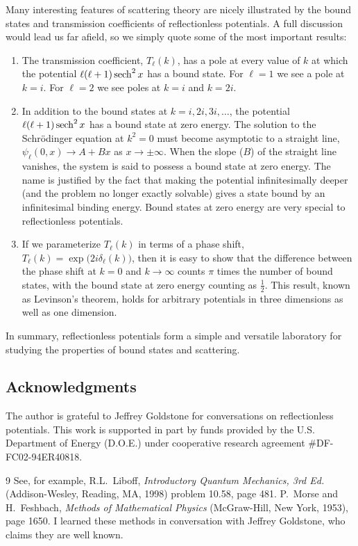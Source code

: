 \documentclass[12pt,twoside]{article}
\newcommand{\sech}{\mathop{\rm sech}\nolimits}
\begin{document}
\noindent
Many interesting features of scattering theory are nicely illustrated by the bound states and transmission coefficients of reflectionless potentials.  A full discussion would lead us far afield, so we simply quote some of the most important results:
%
\begin{enumerate}
  \item
    The transmission coefficient, $T_\ell (k)$, has a pole at every     value of $k$ at which the potential $\ell(\ell+1)\sech^2x$ has a bound state.  For $\ell=1$ we see a pole at     $k=i$. For $\ell=2$ we see poles at $k=i$ and $k=2i$.   \item
    In addition to the bound states at $k=i,2i,3i,\ldots$, the     potential $\ell(\ell+1)\sech^2x$ has a bound state at     zero energy.  The solution to the Schr\"odinger equation at $k^2=0$     must become asymptotic to a straight line, $\psi_\ell (0,x)     \rightarrow A+Bx$ as $x\rightarrow\pm\infty$.  When the slope ($B$) of     the straight line vanishes, the system is said to possess a bound     state at zero energy.  The name is justified by the fact that     making the potential infinitesimally deeper (and the problem no     longer exactly solvable) gives a state bound by an infinitesimal     binding energy.  Bound states at zero energy are very special to     reflectionless potentials.
  \item
    If we parameterize $T_\ell (k)$ in terms of a phase shift,     $T_\ell (k)=\exp\bigl(2i\delta_\ell (k)\bigr)$, then it is easy to show     that the difference between the phase shift at $k=0$ and     $k\rightarrow\infty$ counts $\pi$ times the number of bound     states, with the bound state at zero energy counting as $\frac{1}{2}$.  
    This result, known as Levinson's theorem, holds for arbitrary     potentials in three dimensions as well as one dimension.
\end{enumerate}
In summary, reflectionless potentials form a simple and versatile laboratory for studying the properties of bound states and scattering.  
\subsection*{Acknowledgments}
 The author is grateful to Jeffrey Goldstone for conversations on reflectionless potentials.  This work is supported in part by funds provided by the U.S. Department of Energy (D.O.E.) under cooperative research agreement \#DF-FC02-94ER40818.


\begin{thebibliography} {9}
 See, for example, R.L.~Liboff, {\sl Introductory Quantum Mechanics, 3rd Ed.} (Addison-Wesley, Reading, MA, 1998) problem 10.58, page 481.
P.~Morse and H.~Feshbach, {\sl Methods of Mathematical Physics\/} (McGraw-Hill, New York, 1953), page 1650.
 I learned these methods in conversation with Jeffrey Goldstone, who claims they are well known.


\end{thebibliography}

%
\end{document}
